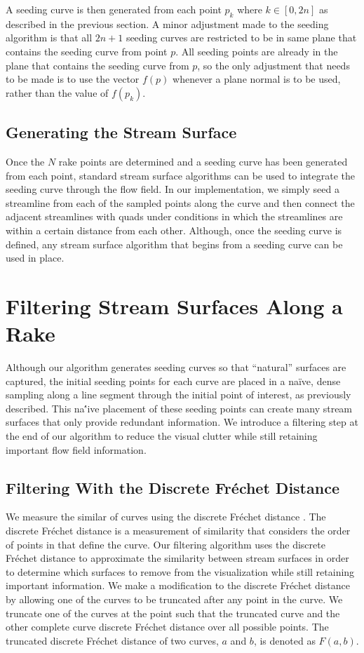 \documentclass{vgtc}                          %
\begin{document}
A seeding curve is then generated from each point $p_k$ where $k \in [0, 2n]$ as described in the previous section.
A minor adjustment made to the seeding algorithm is that all $2n + 1$ seeding curves are restricted to be in same plane that contains the seeding curve from point $p$.
All seeding points are already in the plane that contains the seeding curve from $p$, so the only adjustment that needs to be made is to use the vector $f(p)$ whenever a plane normal is to be used, rather than the value of $f(p_k)$.

\subsection{Generating the Stream Surface}

Once the $N$ rake points are determined and a seeding curve has been generated from each point, standard stream surface algorithms can be used to integrate the seeding curve through the flow field.
In our implementation, we simply seed a streamline from each of the sampled points along the curve and then connect the adjacent streamlines with quads under conditions in which the streamlines are within a certain distance from each other.
Although, once the seeding curve is defined, any stream surface algorithm that begins from a seeding curve can be used in place.

\section{Filtering Stream Surfaces Along a Rake} \label{sec:filtering}

Although our algorithm generates seeding curves so that ``natural'' surfaces are captured, the initial seeding points for each curve are placed in a na\"ive, dense sampling along a line segment through the initial point of interest, as previously described.
This na\''ive placement of these seeding points can create many stream surfaces that only provide redundant information.
We introduce a filtering step at the end of our algorithm to reduce the visual clutter while still retaining important flow field information.

\subsection{Filtering With the Discrete Fr\'echet Distance}

We measure the similar of curves using the discrete Fr\'echet distance \cite{eiter1994computing}.
The discrete Fr\'echet distance is a measurement of similarity that considers the order of points in that define the curve.
Our filtering algorithm uses the discrete Fr\'echet distance to approximate the similarity between stream surfaces in order to determine which surfaces to remove from the visualization while still retaining important information.
We make a modification to the discrete Fr\'echet distance by allowing one of the curves to be truncated after any point in the curve.
We truncate one of the curves at the point such that the truncated curve and the other complete curve discrete Fr\'echet distance over all possible points.
The truncated discrete Fr\'echet distance of two curves, $a$ and $b$, is denoted as $F(a, b)$.
\end{document}
